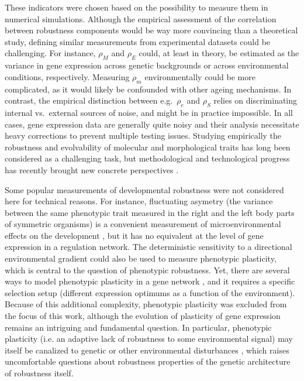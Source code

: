 \documentclass[10pt,a4paper]{article}
\newcommand{\stability}{{\rho_S}}
\newcommand{\earlyenv}{{\rho_E}}
\newcommand{\lateenv}{{\rho_e}}
\newcommand{\earlymut}{{\rho_M}}
\newcommand{\latemut}{{\rho_m}}
\begin{document}
These indicators were chosen based on the possibility to measure them in numerical simulations. Although the empirical assessment of the correlation between robustness components would be way more convincing than a theoretical study, defining similar measurements from experimental datasets could be challenging. For instance, $\earlymut$ and $\earlyenv$ could, at least in theory, be estimated as the variance in gene expression across genetic backgrounds or across environmental conditions, respectively. Measuring $\latemut$ environmentally could be more complicated, as it would likely be confounded with other ageing mechanisms. In contrast, the empirical distinction between e.g.\ $\lateenv$ and $\stability$ relies on discriminating internal vs.\ external sources of noise, and might be in practice impossible. In all cases, gene expression data are generally quite noisy and their analysis necessitate heavy corrections to prevent multiple testing issues. Studying empirically the robustness and evolvability of molecular and morphological traits has long been considered as a challenging task, but methodological and technological progress has recently brought new concrete perspectives \citep{PW19}. 

Some popular measurements of developmental robustness were not considered here for technical reasons. For instance, fluctuating asymetry (the variance between the same phenotypic trait measured in the right and the left body parts of symmetric organisms) is a convenient measurement of microenvironmental effects on the development \citep{DD01,LK05}, but it has no equivalent at the level of gene expression in a regulation network. The deterministic sensitivity to a directional environmental gradient could also be used to measure phenotypic plasticity, which is central to the question of phenotypic robustness. Yet, there are several ways to model phenotypic plasticity in a gene network \citep{Mas04,ORL18}, and it requires a specific selection setup (different expression optimums as a function of the environment). Because of this additional complexity, phenotypic plasticity was excluded from the focus of this work, although the evolution of plasticity of gene expression remains an intriguing and fundamental question. In particular, phenotypic plasticity (i.e. an adaptive lack of robustness to some environmental signal) may itself be canalized to genetic or other environmental disturbances \citep{SK94}, which raises uncomfortable questions about robustness properties of the genetic architecture of robustness itself.  
\end{document}
